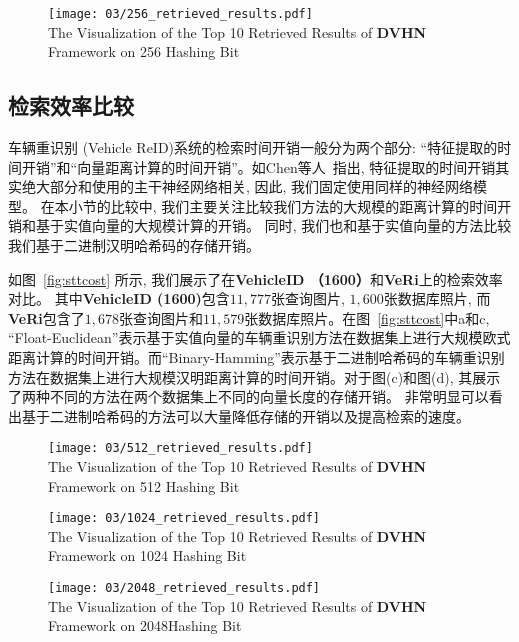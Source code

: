 \begin{figure}[!htp]
    \centering
    \texttt{[image: 03/256\_retrieved\_results.pdf]} \\
      {The Visualization of the Top 10 Retrieved Results of \textbf{DVHN} Framework on 256 Hashing Bit}
   \label{fig:retrieval256}
\end{figure}
\subsection{检索效率比较}
车辆重识别 (Vehicle ReID)系统的检索时间开销一般分为两个部分: ``特征提取的时间开销''和``向量距离计算的时间开销''。如Chen等人~\cite{chen2020deep}指出, 特征提取的时间开销其实绝大部分和使用的主干神经网络相关, 因此, 我们固定使用同样的神经网络模型。 在本小节的比较中, 我们主要关注比较我们方法的大规模的距离计算的时间开销和基于实值向量的大规模计算的开销。 同时, 我们也和基于实值向量的方法比较我们基于二进制汉明哈希码的存储开销。\par
如图~\ref{fig:sttcost} 所示, 我们展示了在\textbf{VehicleID （1600）}和\textbf{VeRi}上的检索效率对比。 其中\textbf{VehicleID (1600)}包含$11,777$张查询图片, $1,600$张数据库照片, 而 \textbf{VeRi}包含了$1,678$张查询图片和$11,579$张数据库照片。在图~\ref{fig:sttcost}中a和c, ``Float-Euclidean''表示基于实值向量的车辆重识别方法在数据集上进行大规模欧式距离计算的时间开销。而``Binary-Hamming''表示基于二进制哈希码的车辆重识别方法在数据集上进行大规模汉明距离计算的时间开销。对于图(c)和图(d), 其展示了两种不同的方法在两个数据集上不同的向量长度的存储开销。 非常明显可以看出基于二进制哈希码的方法可以大量降低存储的开销以及提高检索的速度。
\begin{figure}[!htp]
    \centering
    \texttt{[image: 03/512\_retrieved\_results.pdf]} \\
      {The Visualization of the Top 10 Retrieved Results of \textbf{DVHN} Framework on 512 Hashing Bit}
   \label{fig:retrieval512}
\end{figure}
\begin{figure}[!htp]
    \centering
    \texttt{[image: 03/1024\_retrieved\_results.pdf]} \\
      {The Visualization of the Top 10 Retrieved Results of \textbf{DVHN} Framework on 1024 Hashing Bit}
   \label{fig:retrieval1024}
\end{figure}
\begin{figure}[!htp]
    \centering
    \texttt{[image: 03/2048\_retrieved\_results.pdf]} \\
      {The Visualization of the Top 10 Retrieved Results of \textbf{DVHN} Framework on 2048Hashing Bit}
   \label{fig:retrieval2048}
\end{figure}
